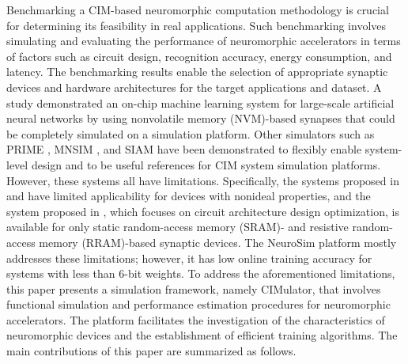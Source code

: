 \documentclass[journal]{IEEEtran}
\begin{document}
Benchmarking a CIM-based neuromorphic computation methodology is
crucial for determining its feasibility in real applications. Such benchmarking
involves simulating and evaluating the performance of neuromorphic accelerators
in terms of factors such as circuit design, recognition accuracy, energy consumption, and latency. The benchmarking results enable the selection
of appropriate synaptic devices and hardware architectures for the
target applications and dataset. A study \cite{PCM02} demonstrated an on-chip machine
learning system for large-scale artificial neural networks by using nonvolatile
memory (NVM)-based synapses that could be completely simulated
on a simulation platform. Other simulators such as PRIME \cite{PRIME}, MNSIM \cite{MNSIM}, and SIAM \cite{SIAM} have been demonstrated to flexibly enable system-level design and to be useful references for CIM system simulation platforms. However, these systems all have limitations. Specifically, the systems proposed
in \cite{PRIME} and \cite{MNSIM} have limited applicability for devices with nonideal properties, and the system proposed in \cite{SIAM}, which focuses on circuit architecture design optimization, is available for only static random-access memory (SRAM)- and resistive random-access memory (RRAM)-based synaptic devices. The NeuroSim platform \cite{NeuroSim1, NeuroSim2} mostly addresses these limitations; however, it has low online training accuracy for systems with less than 6-bit weights. To address the aforementioned limitations, this paper presents a simulation framework, namely CIMulator, that involves functional simulation and performance estimation procedures for neuromorphic accelerators. The platform facilitates the investigation of the characteristics of neuromorphic devices and the establishment of efficient training algorithms. The main contributions of this paper are summarized as follows.
\end{document}
